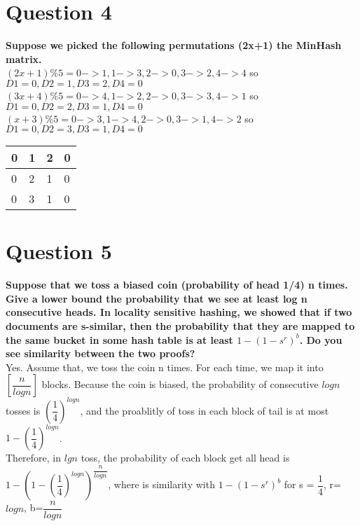 \documentclass{article}
\begin{document}
\clearpage

\section{Question 4}
\textbf{Suppose we picked the following permutations (2x+1)%
the MinHash matrix.}\\

$(2x+1)\%5 = 0->1, 1->3, 2->0, 3->2, 4->4$ so $D1 = 0, D2 = 1, D3 = 2, D4 = 0$\\

$(3x+4)\%5 = 0->4, 1->2, 2->0, 3->3, 4->1$ so $D1 = 0, D2 = 2, D3 = 1, D4 = 0$\\
 
$(x+3)\%5 = 0->3, 1->4, 2->0, 3->1, 4->2$ so $D1 = 0, D2 = 3, D3 = 1, D4 = 0$\\


\begin{tabular}{ l | l | l | l }

 \hline
  0 & 1 & 2 & 0 \\  \hline
  0 & 2 & 1 & 0 \\  \hline
  0 & 3 & 1 & 0 \\  \hline
\end{tabular}

\clearpage

\section{Question 5}
\textbf{Suppose that we toss a biased coin (probability of head 1/4) n times. Give a lower bound
the probability that we see at least log n consecutive heads.
In locality sensitive hashing, we showed that if two documents are s-similar, then the probability
that they are mapped to the same bucket in some hash table is at least $ 1 - (1 - s^r)^b$.
Do you see similarity between the two proofs?} \\

Yes. Assume that, we toss the coin n times. For each time, we map it into $[\dfrac{n}{logn}]$ blocks. Because the coin is biased, the probability of consecutive $logn$ tosses is $(\dfrac{1}{4})^{logn}$, and the proablitly of toss in each block of tail is at most $1-(\dfrac{1}{4})^{logn}$.\\

Therefore, in $ lg n$ toss, the probability of each block get all head is $1-(1-(\dfrac{1}{4})^{logn})^{\dfrac{n}{logn}}$, where is similarity with $ 1 - (1 - s^r)^b$ for s = $\dfrac{1}{4}$, r= $logn$, b=$\dfrac{n}{logn}$\\
\end{document}
